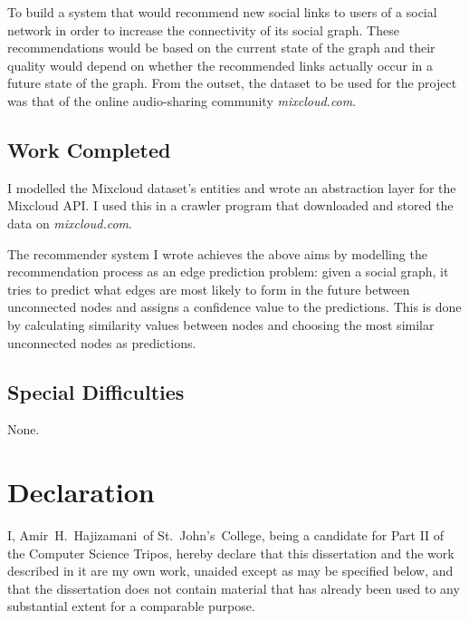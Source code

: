 \documentclass[a4paper,12pt,twoside,notitlepage]{report}
\def\authorname{Amir~H.~Hajizamani}
\def\authorcollege{St.~John's~College}
\def\mixurl{\emph{mixcloud.com}}
\begin{document}
To build a system that would recommend new social links to users of a social
network in order to increase the connectivity of its social graph. These
recommendations would be based on the current state of the graph and their
quality would depend on whether the recommended links actually occur in a
future state of the graph. From the outset, the dataset to be used for the
project was that of the online audio-sharing community \mixurl.

\subsection*{Work Completed}
I modelled the Mixcloud dataset's entities and wrote an abstraction layer for
the Mixcloud API. I used this in a crawler program that downloaded and stored
the data on \mixurl.

The recommender system I wrote achieves the above aims by modelling the
recommendation process as an edge prediction problem: given a social graph,
it tries to predict what edges are most likely to form in the future between
unconnected nodes and assigns a confidence value to the predictions. This is
done by calculating similarity values between nodes and choosing the most
similar unconnected nodes as predictions.

\subsection*{Special Difficulties}

None.

\newpage

\section*{Declaration}

I, \authorname~of \authorcollege, being a candidate for Part II of the Computer
Science Tripos, hereby declare that this dissertation and the work described in
it are my own work, unaided except as may be specified below, and that
the dissertation does not contain material that has already been used to any
substantial extent for a comparable purpose.

\bigskip
\bigskip
\bigskip
{}

\medskip
{}


\clearpage
\end{document}
